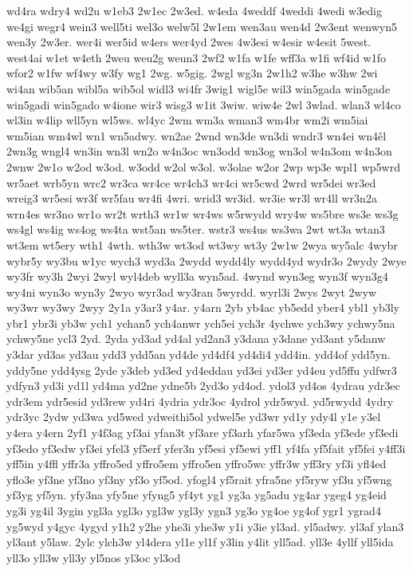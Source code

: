 {wd4ra
wdry4
wd2u
w1eb3
2w1ec
2w3ed.
w4eda
4weddf
4weddi
4wedi
w3edig
we4gi
wegr4
wein3
well5ti
wel3o
welw5l
2w1em
wen3au
wen4d
2w3ent
wenwyn5
wen3y
2w3er.
wer4i
wer5id
w4ers
wer4yd
2wes
4w3esi
w4esir
w4esit
5west.
west4ai
w1et
w4eth
2weu
weu2g
weun3
2wf2
w1fa
w1fe
wff3a
w1fi
wf4id
w1fo
wfor2
w1fw
wf4wy
w3fy
wg1
2wg.
w5gig.
2wgl
wg3n
2w1h2
w3he
w3hw
2wi
wi4an
wib5an
wibl5a
wib5ol
widl3
wi4fr
3wig1
wigl5e
wil3
win5gada
win5gade
win5gadi
win5gado
w4ione
wir3
wisg3
w1it
3wiw.
wiw4e
2wl
3wlad.
wlan3
wl4co
wl3in
w4lip
wll5yn
wl5ws.
wl4yc
2wm
wm3a
wman3
wm4br
wm2i
wm5iai
wm5ian
wm4wl
wn1
wn5adwy.
wn2ae
2wnd
wn3de
wn3di
wndr3
wn4ei
wn4êl
2wn3g
wngl4
wn3in
wn3l
wn2o
w4n3oc
wn3odd
wn3og
wn3ol
w4n3om
w4n3on
2wnw
2w1o
w2od
w3od.
w3odd
w2ol
w3ol.
w3olae
w2or
2wp
wp3e
wpl1
wp5wrd
wr5aet
wrb5yn
wrc2
wr3ca
wr4ce
wr4ch3
wr4ci
wr5cwd
2wrd
wr5dei
wr3ed
wreig3
wr5esi
wr3f
wr5fau
wr4fi
4wri.
wrid3
wr3id.
wr3ie
wr3l
wr4ll
wr3n2a
wrn4es
wr3no
wr1o
wr2t
wrth3
wr1w
wr4ws
w5rwydd
wry4w
ws5bre
ws3e
ws3g
ws4gl
ws4ig
ws4og
ws4ta
wst5an
ws5ter.
wstr3
ws4us
ws3wa
2wt
wt3a
wtan3
wt3em
wt5ery
wth1
4wth.
wth3w
wt3od
wt3wy
wt3y
2w1w
2wya
wy5alc
4wybr
wybr5y
wy3bu
w1yc
wych3
wyd3a
2wydd
wydd4ly
wydd4yd
wydr3o
2wydy
2wye
wy3fr
wy3h
2wyi
2wyl
wyl4deb
wyll3a
wyn5ad.
4wynd
wyn3eg
wyn3f
wyn3g4
wy4ni
wyn3o
wyn3y
2wyo
wyr3ad
wy3ran
5wyrdd.
wyrl3i
2wys
2wyt
2wyw
wy3wr
wy3wy
2wyy
2y1a
y3ar3
y4ar.
y4arn
2yb
yb4ac
yb5edd
yber4
ybl1
yb3ly
ybr1
ybr3i
yb3w
ych1
ychan5
ych4anwr
ych5ei
ych3r
4ychwe
ych3wy
ychwy5na
ychwy5ne
ycl3
2yd.
2yda
yd3ad
yd4al
yd2an3
y3dana
y3dane
yd3ant
y5danw
y3dar
yd3as
yd3au
ydd3
ydd5an
yd4de
yd4df4
yd4di4
ydd4in.
ydd4of
ydd5yn.
yddy5ne
ydd4ysg
2yde
y3deb
yd3ed
yd4eddau
yd3ei
yd3er
yd4eu
yd5ffu
ydfwr3
ydfyn3
yd3i
yd1l
yd4ma
yd2ne
ydne5b
2yd3o
yd4od.
ydol3
yd4os
4ydrau
ydr3ec
ydr3em
ydr5esid
yd3rew
yd4ri
4ydria
ydr3oc
4ydrol
ydr5wyd.
yd5rwydd
4ydry
ydr3yc
2ydw
yd3wa
yd5wed
ydweithi5ol
ydwel5e
yd3wr
yd1y
ydy4l
y1e
y3el
y4era
y4ern
2yf1
y4f3ag
yf3ai
yfan3t
yf3are
yf3arh
yfar5wa
yf3eda
yf3ede
yf3edi
yf3edo
yf3edw
yf3ei
yfel3
yf5erf
yfer3n
yf5esi
yf5ewi
yff1
yf4fa
yf5fait
yf5fei
y4ff3i
yff5in
y4ffl
yffr3a
yffro5ed
yffro5em
yffro5en
yffro5wc
yffr3w
yff3ry
yf3i
yfl4ed
yflo3e
yf3ne
yf3no
yf3ny
yf3o
yf5od.
yfogl4
yf5rait
yfra5ne
yf5ryw
yf3u
yf5wng
yf3yg
yf5yn.
yfy3na
yfy5ne
yfyng5
yf4yt
yg1
yg3a
yg5adu
yg4ar
ygeg4
yg4eid
yg3i
yg4il
3ygin
ygl3a
ygl3o
ygl3w
ygl3y
ygn3
yg3o
yg4oe
yg4of
ygr1
ygrad4
yg5wyd
y4gyc
4ygyd
y1h2
y2he
yhe3i
yhe3w
y1i
y3ie
yl3ad.
yl5adwy.
yl3af
ylan3
yl3ant
y5law.
2ylc
ylch3w
yl4dera
yl1e
yl1f
y3lin
y4lit
yll5ad.
yll3e
4yllf
yll5ida
yll3o
yll3w
yll3y
yl5nos
yl3oc
yl3od
}
